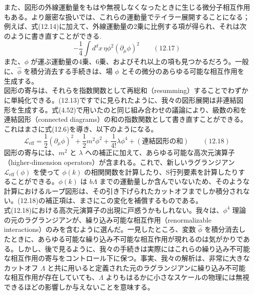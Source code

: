 \documentclass[uplatex,dvipdfmx]{jsarticle}
\begin{document}
また、図形の外線運動量をもはや無視しなくなったときに生じる微分子相互作用もある。より厳密な扱いでは、これらの運動量でテイラー展開することになる；例えば、式(12.14)に加えて、外線運動量の2乗に比例する項が得られ、それは次のように書き直すことができる.
\begin{equation}
    -\frac{1}{4} \int d^dx \, \eta \phi^2 (\partial_\mu \phi)^2 \qquad (12.17)
\end{equation}
また、$\phi$ が運ぶ運動量の4乗、6乗、およびそれ以上の項も見つかるだろう。一般に、$\hat{\phi}$ を積分消去する手続きは、場 $\phi$ とその微分のあらゆる可能な相互作用を生成する。\\
図形の寄与は、それらを指数関数として再総和（resumming）することでわずかに単純化できる。(12.13)ですでに見られたように、我々の図形展開は非連結図形を生成する。式(4.52)で用いたのと同じ組み合わせの議論により、級数の和を連結図形（connected diagrams）の和の指数関数として書き直すことができる。これはまさに式(12.6)を導き、以下のようになる。
\begin{equation}
    \mathcal{L}_{\text{eff}} = \frac{1}{2}(\partial_\mu \phi)^2 + \frac{1}{2}m^2 \phi^2 + \frac{1}{4!}\lambda \phi^4 + (\text{連結図形の和}) \qquad (12.18)
\end{equation}
図形の寄与には、$m^2$ と $\lambda$ への補正に加えて、あらゆる可能な高次元演算子（higher-dimension operators）が含まれる。これで、新しいラグランジアン $\mathcal{L}_{\text{eff}}(\phi)$ を使って $\phi(k)$ の相関関数を計算したり、S行列要素を計算したりすることができる。$\phi(k)$ は $b\Lambda$ までの運動量しか含んでいないため、そのような計算におけるループ図形は、その引き下げられたカットオフまでしか積分されない。(12.18)の補正項は、まさにこの変化を補償するものである。\\
式(12.18)における高次元演算子の出現に戸惑うかもしれない。我々は、$\phi^4$ 理論の元のラグランジアンが、繰り込み可能な相互作用（renormalizable interactions）のみを含むように選んだ。一見したところ、変数 $\hat{\phi}$ を積分消去したときに、あらゆる可能な繰り込み不可能な相互作用が現れるのは気がかりである。しかし、後で見るように、我々の手続きは実際にはこれらの繰り込み不可能な相互作用の寄与をコントロール下に保つ。事実、我々の解析は、非常に大きなカットオフ $\Lambda$ と共に用いると定義された元のラグランジアンに繰り込み不可能な相互作用が存在していても、$\Lambda$ よりもはるかに小さなスケールの物理には無視できるほどの影響しか与えないことを意味する。
\end{document}
